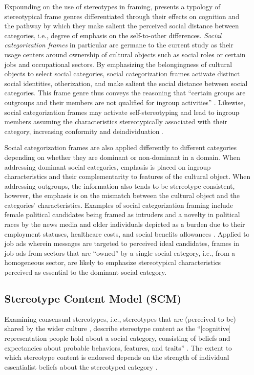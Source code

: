 \documentclass[man]{apa7}
\begin{document}
Expounding on the use of stereotypes in framing, \parencite{Yang2015a} presents a typology of stereotypical frame genres differentiated through their effects on cognition and the pathway by which they make salient the perceived social distance between categories, i.e., degree of emphasis on the self-to-other differences. \textit{Social categorization frames} in particular are germane to the current study as their usage centers around ownership of cultural objects such as social roles or certain jobs and occupational sectors. By emphasizing the belongingness of cultural objects to select social categories, social categorization frames activate distinct social identities, otherization, and make salient the social distance between social categories. This frame genre thus conveys the reasoning that “certain groups are outgroups and their members are not qualified for ingroup activities” \parencite[p. 261]{Yang2015a}. Likewise, social categorization frames may activate self-stereotyping and lead to ingroup members assuming the characteristics stereotypically associated with their category, increasing conformity and deindividuation \parencite{brown2003BlackwellHandbookSocial}.

Social categorization frames are also applied differently to different categories depending on whether they are dominant or non-dominant in a domain. When addressing dominant social categories, emphasis is placed on ingroup characteristics and their complementarity to features of the cultural object. When addressing outgroups, the information also tends to be stereotype-consistent, however, the emphasis is on the mismatch between the cultural object and the categories’ characteristics. Examples of social categorization framing include female political candidates being framed as intruders and a novelty in political races by the news media \parencite{meeks_all_2013, sullivan_1984_1989} and older individuals depicted as a burden due to their employment statuses, healthcare costs, and social benefits allowances \parencite{ng_evaluating_2012}. Applied to job ads wherein messages are targeted to perceived ideal candidates, frames in job ads from sectors that are “owned” by a single social category, i.e., from a homogeneous sector, are likely to emphasize stereotypical characteristics perceived as essential to the dominant social category.

\subsection{Stereotype Content Model (SCM)}
\label{scm}
Examining consensual stereotypes, i.e., stereotypes that are (perceived to be) shared by the wider culture \parencite{fiske_prejudices_2017, gardner1994}, \Textcite{beukeboom_how_2019} describe stereotype content as the “[cognitive] representation people hold about a social category, consisting of beliefs and expectancies about probable behaviors, features, and traits” . The extent to which stereotype content is endorsed depends on the strength of individual essentialist beliefs about the stereotyped category \parencite[for perceived category essentialism and stereotyping, see][]{beukeboom_how_2019}.
\end{document}
